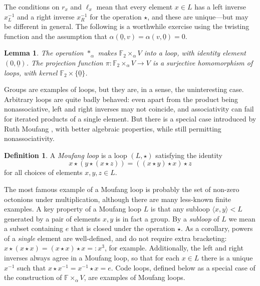 \documentclass{article}
\theoremstyle{plain}
\newtheorem{lemma}{Lemma}
\theoremstyle{definition}
\newtheorem*{definition}{Definition}
\def \FF {\mathbb{F}}
\begin{document}
The conditions on $r_x$ and $\ell_x$ mean that every element $x\in L$ has a left inverse $x_L^{-1}$ and a right inverse $x_R^{-1}$ for the operation $\star$, and these are unique---but may be different in general. 
The following is a worthwhile exercise using the twisting function and the assumption that $\alpha(\underline{0},v)=\alpha(v,\underline{0})=0$.

\begin{lemma}
The operation $\ast_\alpha$ makes $\FF_2\times_\alpha V$ into a loop, with identity element $(0,\underline{0})$.
The projection function $\pi\colon \FF_2\times_\alpha V \to V$ is a surjective homomorphism of loops, with kernel $\FF_2 \times\{\underline{0}\}$.
\end{lemma}

Groups are examples of loops, but they are, in a sense, the uninteresting case. 
Arbitrary loops are quite badly behaved: even apart from the product being nonassociative, left and right inverses may not coincide, and associativity can fail for iterated products of a single element. 
But there is a special case introduced by Ruth Moufang \cite{Moufang}, with better algebraic properties, while still permitting nonassociativity.

\begin{definition}
A \emph{Moufang loop} is a loop $(L,\star)$ satisfying the identity
\[
x \star (y \star (x \star z)) = ((x \star y) \star x) \star z
\]
for all choices of elements $x,y,z\in L$.
\end{definition}

The most famous example of a Moufang loop is probably the set of non-zero octonions under multiplication, although there are many less-known finite examples. 
A key property of a Moufang loop $L$ is that any subloop $\langle x,y\rangle < L$ generated by a pair of elements $x,y$ is in fact a group. 
By a \emph{subloop} of $L$ we mean a subset containing $e$ that is closed under the operation $\star$.
As a corollary, powers of a \emph{single} element are well-defined, and do not require extra bracketing: $x\star (x \star x) = (x\star x) \star x =: x^3$, for example. 
Additionally, the left and right inverses always agree in a Moufang loop, so that for each $x\in L$ there is a unique $x^{-1}$ such that $x\star x^{-1} = x^{-1}\star x = e$. 
Code loops, defined below as a special case of the construction of $\FF\times_\alpha V$, are examples of Moufang loops.
\end{document}
